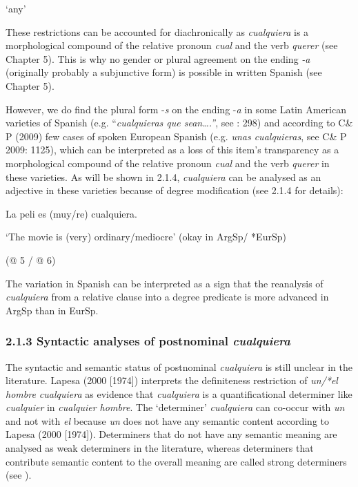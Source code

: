 \documentclass[output=paper]{langscibook}
\begin{document}
  ‘any’

These restrictions can be accounted for diachronically as \textit{cualquiera} is a morphological compound of the relative pronoun \textit{cual} and the verb \textit{querer} (see Chapter 5). This is why no gender or plural agreement on the ending \textit{{}-a} (originally probably a subjunctive form) is possible in written Spanish (see Chapter 5).

  However, we do find the plural form -\textit{s} on the ending -\textit{a} in some Latin American varieties of Spanish (e.g. “\textit{cualquieras que sean….”}, see \citealt{Rainer1993}: 298) and according to C\& P (2009) few cases of spoken European Spanish (e.g. \textit{unas cualquieras}, see C\& P 2009: 1125), which can be interpreted as a loss of this item’s transparency as a morphological compound of the relative pronoun \textit{cual} and the verb \textit{querer} in these varieties. As will be shown in 2.1.4, \textit{cualquiera} can be analysed as an adjective in these varieties because of degree modification (see 2.1.4 for details):

  La peli es (muy/re) cualquiera. 

‘The movie is (very) ordinary/mediocre’  (okay in ArgSp/ *EurSp)

  (@ 5 / @ 6)

The variation in Spanish can be interpreted as a sign that the reanalysis of \textit{cualquiera} from a relative clause into a degree predicate is more advanced in ArgSp than in EurSp. 

\subsubsection{\textbf{2.1.3} \textbf{Syntactic} \textbf{analyses} \textbf{of} \textbf{postnominal} \textbf{\textit{cualquiera}}}

The syntactic and semantic status of postnominal \textit{cualquiera} is still unclear in the literature. Lapesa (2000 [1974]) interprets the definiteness restriction of \textit{un/*el hombre cualquiera} as evidence that \textit{cualquiera} is a quantificational determiner like \textit{cualquier} in \textit{cualquier hombre}. The ‘determiner’ \textit{cualquiera} can co-occur with \textit{un} and not with \textit{el} because \textit{un} does not have any semantic content according to Lapesa (2000 [1974]). Determiners that do not have any semantic meaning are analysed as weak determiners in the literature, whereas determiners that contribute semantic content to the overall meaning are called strong determiners (see \citealt{Zamparelli2000}). 
\end{document}
